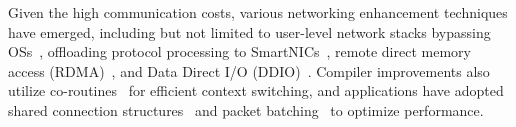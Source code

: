 

Given the high communication costs, various networking enhancement techniques have emerged, including but not limited to user-level network stacks bypassing OSs~\cite{mtcp_nsdi14}, offloading protocol processing to SmartNICs~\cite{xenic_sosp21, ipipe_sigcomm19, linefs_sosp21}, remote direct memory access (RDMA)~\cite{farm, myth_vldb17}, and Data Direct I/O (DDIO)~\cite{ddio_ispass20, ddio-doc}. Compiler improvements also utilize co-routines~\cite{fasst, drtmh, grappa_atc15} for efficient context switching, and applications have adopted shared connection structures~\cite{fasst} and packet batching~\cite{grappa_atc15, guideline_atc16} to optimize performance.



